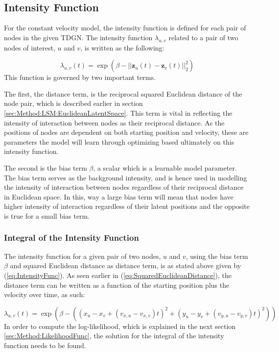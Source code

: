 \subsection{Intensity Function}
\label{sec:Method:IntensityFunc}
For the constant velocity model, the intensity function is defined for each pair of nodes in the given TDGN.
The intensity function $\lambda_{u,v}$ related to a pair of two nodes of interest, $u$ and $v$, is written as the following:

\begin{equation}
    \lambda_{u,v}(t)
    =
    \exp \left(\beta - ||\textbf{z}_u(t) - \textbf{z}_v(t)||_2^2\right)
    \label{eq:IntensityFunc}
\end{equation}
This function is governed by two important terms.

The first, the distance term, is the reciprocal squared Euclidean distance of the node pair, which is described earlier in section \ref{sec:Method:LSM:EuclideanLatentSpace}.
This term is vital in reflecting the intensity of interaction between nodes as their reciprocal distance.
As the positions of nodes are dependent on both starting position and velocity, these are parameters the model will learn through optimizing based ultimately on this intensity function.

The second is the bias term $\beta$, a scalar which is a learnable model parameter. 
The bias term serves as the background intensity, and is hence used in modelling the intensity of interaction between nodes regardless of their reciprocal distance in Euclidean space. 
In this, way a large bias term will mean that nodes have higher intensity of interaction regardless of their latent positions and the opposite is true for a small bias term.


\subsubsection{Integral of the Intensity Function}
\label{sec:Method:IntensityFunc:IntegralIntensityFunc}
The intensity function for a given pair of two nodes, $u$ and $v$, using the bias term $\beta$ and squared Euclidean distance as distance term, is as stated above given by (\ref{eq:IntensityFunc}).
As seen earlier in (\ref{eq:SquaredEuclideanDistance}), the distance term can be written as a function of the starting position plus the velocity over time, as such:

\begin{equation}
    \lambda_{u,v}(t)
    =
    \exp \left(\beta - \left((x_u - x_v + (v_{x,u} - v_{x,v})t)^2 + (y_u - y_v + ( v_{y,u} - v_{y,v})t)^2\right)\right)
\end{equation}
In order to compute the log-likelihood, which is explained in the next section \ref{sec:Method:LikelihoodFunc}, the solution for the integral of the intensity function needs to be found. 

